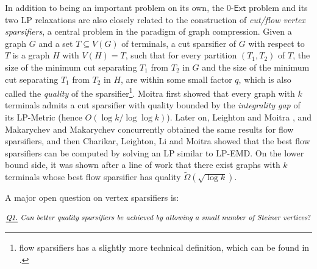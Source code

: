 \documentclass[11pt]{article}
\theoremstyle{definition}
\newcounter{note}
\newcommand{\ze}{$0$-$\textsf{Ext}$\xspace}
\begin{document}
\begin{titlepage}
In addition to being an important problem on its own, the \ze problem and its two LP relaxations are also closely related to the construction of \emph{cut/flow vertex sparsifiers}, a central problem in the paradigm of graph compression.
Given a graph $G$ and a set $T\subseteq V(G)$ of terminals, a cut sparsifier of $G$ with respect to $T$ is a graph $H$ with $V(H)=T$, such that for every partition $(T_1,T_2)$ of $T$, the size of the minimum cut separating $T_1$ from $T_2$ in $G$ and the size of the minimum cut separating $T_1$ from $T_2$ in $H$, are within some small factor $q$, which is also called the \emph{quality} of the sparsifier\footnote{flow sparsifiers has a slightly more technical definition, which can be found in \cite{hagerup1998characterizing,leighton2010extensions,chuzhoy2012vertex,andoni2014towards}.}.
Moitra \cite{moitra2009approximation} first showed that every graph with $k$ terminals admits a cut sparsifier with quality bounded by the \emph{integrality gap} of its \textsf{LP-Metric} (hence $O(\log k/\log\log k)$). Later on, Leighton and Moitra \cite{leighton2010extensions}, and Makarychev and Makarychev \cite{makarychev2010metric} concurrently obtained the same results for flow sparsifiers, and then Charikar, Leighton, Li and Moitra \cite{charikar2010vertex} showed that the best flow sparsifiers can be computed by solving an LP similar to \textsf{LP-EMD}. On the lower bound side, it was shown after a line of work \cite{leighton2010extensions,charikar2010vertex,makarychev2010metric} that there exist graphs with $k$ terminals whose best flow sparsifier has quality $\tilde\Omega(\sqrt{\log k})$.


A major open question on vertex sparsifiers is: 

\vspace{-10pt}
\[\emph{\underline{Q1.} Can better quality sparsifiers be achieved by allowing a small number of Steiner vertices}? 
\]
\vspace{-10pt}


\end{titlepage}
\end{document}
